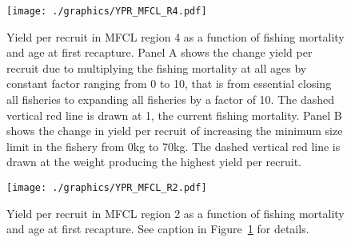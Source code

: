 \documentclass[12pt,letterpaper]{article}
\begin{document}
\begin{figure}
\begin{center}
\texttt{[image: ./graphics/YPR\_MFCL\_R4.pdf]}
\caption{\label{fig:r4ypr}
Yield per recruit in MFCL region 4 as a function of fishing mortality
and age at first recapture.
Panel A shows the change yield per recruit due to multiplying
the fishing mortality at all ages by constant factor ranging from 0 to
10, that is from essential closing all fisheries to expanding all
fisheries by a factor of 10. 
The dashed vertical red line is drawn at 1, the current fishing mortality.
Panel B shows the change in yield per recruit of increasing
the minimum size limit in the fishery from 0kg to 70kg. 
The dashed vertical red line is drawn at the weight producing the
highest yield per recruit.
}
\end{center}
\end{figure}

\begin{figure}
\begin{center}
\texttt{[image: ./graphics/YPR\_MFCL\_R2.pdf]}
\caption{\label{fig:r2ypr}
Yield per recruit in MFCL region 2 as a function of fishing mortality
and age at first recapture. See caption in Figure~\ref{fig:r4ypr} for
details.
}
\end{center}
\end{figure}
\end{document}
